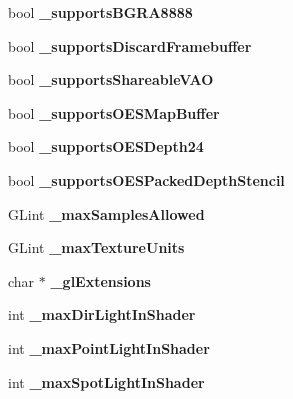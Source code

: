 \begin{DoxyCompactItemize}
bool {\bfseries \+\_\+supports\+B\+G\+R\+A8888}
\item 
\mbox{\label{classConfiguration_ac0c9621393cfa207bc4f06079e571aac}} 
bool {\bfseries \+\_\+supports\+Discard\+Framebuffer}
\item 
\mbox{\label{classConfiguration_af8b1ace06459decb19e53cb3ed7726d7}} 
bool {\bfseries \+\_\+supports\+Shareable\+V\+AO}
\item 
\mbox{\label{classConfiguration_a3dda28e8d101f0b5b7155cf0d0bbb1a2}} 
bool {\bfseries \+\_\+supports\+O\+E\+S\+Map\+Buffer}
\item 
\mbox{\label{classConfiguration_a6117b55d265c690f15c0fd1ead181b9d}} 
bool {\bfseries \+\_\+supports\+O\+E\+S\+Depth24}
\item 
\mbox{\label{classConfiguration_a84ed94797249d9b67adac83ca7a21ec9}} 
bool {\bfseries \+\_\+supports\+O\+E\+S\+Packed\+Depth\+Stencil}
\item 
\mbox{\label{classConfiguration_aea61063a611ef0190a5a8a701de57cbe}} 
G\+Lint {\bfseries \+\_\+max\+Samples\+Allowed}
\item 
\mbox{\label{classConfiguration_a137e9d0e5947096013228205493b867d}} 
G\+Lint {\bfseries \+\_\+max\+Texture\+Units}
\item 
\mbox{\label{classConfiguration_ad6fb9840333980f12c36dcd35ce17763}} 
char $\ast$ {\bfseries \+\_\+gl\+Extensions}
\item 
\mbox{\label{classConfiguration_a3a2d7253325766b68fed85d906e67c17}} 
int {\bfseries \+\_\+max\+Dir\+Light\+In\+Shader}
\item 
\mbox{\label{classConfiguration_abd7f903b20d3871b7d2664e7f03671a9}} 
int {\bfseries \+\_\+max\+Point\+Light\+In\+Shader}
\item 
\mbox{\label{classConfiguration_a8c10d044ac69f91e70e80f0fc18417f9}} 
int {\bfseries \+\_\+max\+Spot\+Light\+In\+Shader}

\end{DoxyCompactItemize}
